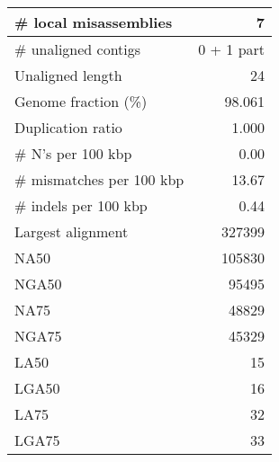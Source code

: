 \documentclass[12pt,a4paper]{article}
\begin{document}
\begin{table}[ht]
\begin{center}
\begin{tabular}{|l*{1}{|r}|}
\# local misassemblies & 7 \\ \hline
\# unaligned contigs & 0 + 1 part \\ \hline
Unaligned length & 24 \\ \hline
Genome fraction (\%) & 98.061 \\ \hline
Duplication ratio & 1.000 \\ \hline
\# N's per 100 kbp & 0.00 \\ \hline
\# mismatches per 100 kbp & 13.67 \\ \hline
\# indels per 100 kbp & 0.44 \\ \hline
Largest alignment & 327399 \\ \hline
NA50 & 105830 \\ \hline
NGA50 & 95495 \\ \hline
NA75 & 48829 \\ \hline
NGA75 & 45329 \\ \hline
LA50 & 15 \\ \hline
LGA50 & 16 \\ \hline
LA75 & 32 \\ \hline
LGA75 & 33 \\ \hline
\end{tabular}
\end{center}
\end{table}
\end{document}
